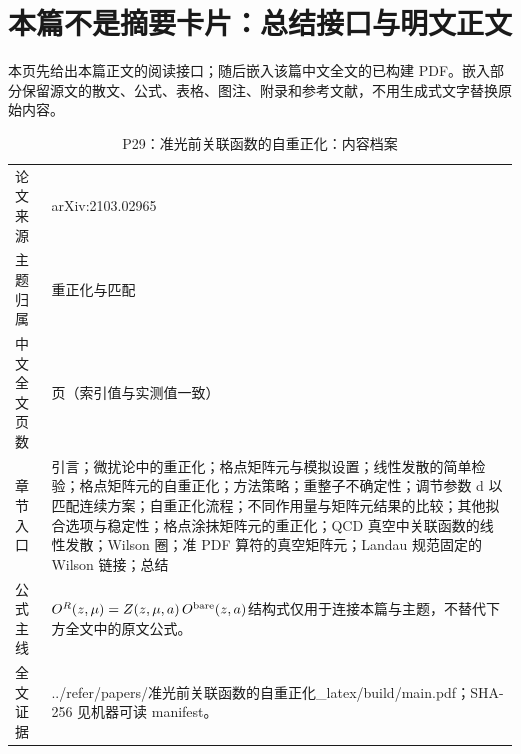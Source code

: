 \documentclass[UTF8,11pt,oneside]{ctexbook}
\begin{document}
\section*{本篇不是摘要卡片：总结接口与明文正文}
本页先给出本篇正文的阅读接口；随后嵌入该篇中文全文的已构建 PDF。嵌入部分保留源文的散文、公式、表格、图注、附录和参考文献，不用生成式文字替换原始内容。
\begin{table}[htbp]
  \centering
  \caption{P29：准光前关联函数的自重正化：内容档案}
  \small
  \begin{tabularx}{0.96\textwidth}{@{}p{3.3cm}>{\raggedright\arraybackslash}X@{}}
    \toprule
    论文来源 & arXiv:2103.02965 \\
    主题归属 & 重正化与匹配 \\
    中文全文页数 & 44 页（索引值与实测值一致） \\
    章节入口 & 引言；微扰论中的重正化；格点矩阵元与模拟设置；线性发散的简单检验；格点矩阵元的自重正化；方法策略；重整子不确定性；调节参数 d 以匹配连续方案；自重正化流程；不同作用量与矩阵元结果的比较；其他拟合选项与稳定性；格点涂抹矩阵元的重正化；QCD 真空中关联函数的线性发散；Wilson 圈；准 PDF 算符的真空矩阵元；Landau 规范固定的 Wilson 链接；总结 \\
    公式主线 & $O^{R}(z,\mu)=Z(z,\mu,a)\,O^{\rm bare}(z,a)$\newline\scriptsize 结构式仅用于连接本篇与主题，不替代下方全文中的原文公式。 \\
    全文证据 & ../\allowbreak{}refer/\allowbreak{}papers/\allowbreak{}准光前关联函数的自重正化\_\allowbreak{}latex/\allowbreak{}build/\allowbreak{}main.pdf；SHA-256 见机器可读 manifest。 \\
    \bottomrule
  \end{tabularx}
\end{table}
\end{document}
